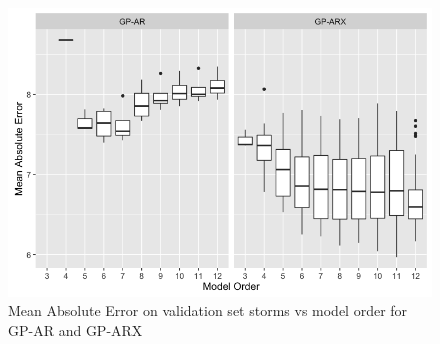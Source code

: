 \documentclass[sw, draft]{AGUTeX}
\begin{document}
\begin{article}


%

%
%
\end{article}
%
%
%
%
%
%

\begin{figure}
\noindent\includegraphics[width=\textwidth]{Compare-mae.png}
\caption{Mean Absolute Error on validation set storms vs model order for GP-AR and GP-ARX}
\label{fig:CompareMae}
\end{figure}
\end{document}

